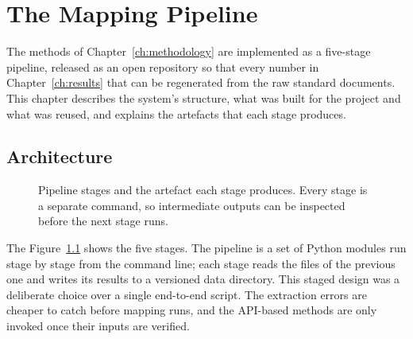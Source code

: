 \chapter{The Mapping Pipeline}\label{ch:prototype}

The methods of Chapter~\ref{ch:methodology} are implemented as a five-stage
pipeline, released as an open repository so that every number in
Chapter~\ref{ch:results} that can be regenerated from the raw standard documents.
This chapter describes the system's structure, what was built for the project
and what was reused, and explains the artefacts that each stage produces.

\section{Architecture}

\begin{figure}[htbp]
\centering
{}
\caption{Pipeline stages and the artefact each stage produces. Every stage is
a separate command, so intermediate outputs can be inspected before the next
stage runs.}
\label{fig:pipeline}
\end{figure}

The Figure~\ref{fig:pipeline} shows the five stages. The pipeline is a set of
Python modules run stage by stage from the command line; each stage reads the
files of the previous one and writes its results to a versioned data
directory. This staged design was a deliberate choice over a single
end-to-end script. The extraction errors are cheaper to catch before mapping runs,
and the API-based methods are only invoked once their inputs are verified.

